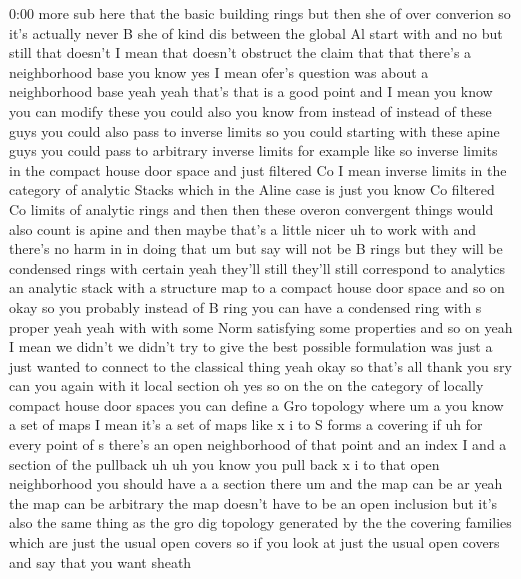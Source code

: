 \begin{unfinished}{0:00}
more  sub  here  that  the  basic
building  rings  but  then  she  of  over
converion  so  it's  actually  never  B  she
of  kind  dis  between  the  global  Al  start
with  and  no  but  still  that  doesn't  I
mean  that  doesn't  obstruct  the  claim
that  that  there's  a  neighborhood  base
you
know  yes  I  mean  ofer's  question  was
about  a  neighborhood  base
yeah  yeah  that's  that  is  a  good  point
and  I  mean  you  know  you  can  modify  these
you  could  also  you  know  from  instead  of
instead  of  these  guys  you  could  also
pass  to  inverse  limits  so  you  could
starting  with  these  apine  guys  you  could
pass  to  arbitrary  inverse
limits  for  example  like  so  inverse
limits  in  the  compact  house  door  space
and  just  filtered  Co  I  mean  inverse
limits  in  the  category  of  analytic
Stacks  which  in  the  Aline  case  is  just
you  know  Co  filtered  Co  limits  of
analytic  rings  and  then  then  these
overon  convergent  things  would  also
count  is  apine  and  then  maybe  that's  a
little
nicer  uh  to  work  with  and  there's  no
harm  in  in  doing  that  um  but  say  will
not  be  B  rings  but  they  will  be
condensed  rings  with  certain  yeah
they'll  still  they'll  still  correspond
to  analytics  an  analytic  stack  with  a
structure  map  to  a  compact  house  door
space  and  so  on  okay  so  you  probably
instead  of  B  ring  you  can  have  a
condensed  ring  with  s  proper  yeah  yeah
with  with  some  Norm  satisfying  some
properties  and  so  on  yeah  I  mean  we
didn't  we  didn't  try  to  give  the  best
possible  formulation  was  just  a  just
wanted  to  connect  to  the  classical  thing
yeah  okay  so  that's  all  thank
you  sry  can  you  again  with  it  local
section  oh  yes  so  on  the  on  the  category
of  locally  compact  house  door  spaces  you
can  define  a  Gro
topology  where  um  a  you  know  a  set  of
maps  I  mean
it's  a  set  of  maps  like  x  i  to  S  forms  a
covering  if  uh  for  every  point  of  s
there's  an  open  neighborhood  of  that
point  and  an  index
I  and  a  section  of  the  pullback  uh  uh
you  know  you  pull  back  x  i  to  that  open
neighborhood  you  should  have  a  a  section
there  um  and  the  map  can  be  ar  yeah  the
map  can  be  arbitrary  the  map  doesn't
have  to  be  an  open  inclusion  but  it's
also  the  same  thing  as  the  gro  dig
topology  generated  by  the  the  covering
families  which  are  just  the  usual  open
covers  so  if  you  look  at  just  the  usual
open  covers  and  say  that  you  want  sheath

\end{unfinished}
